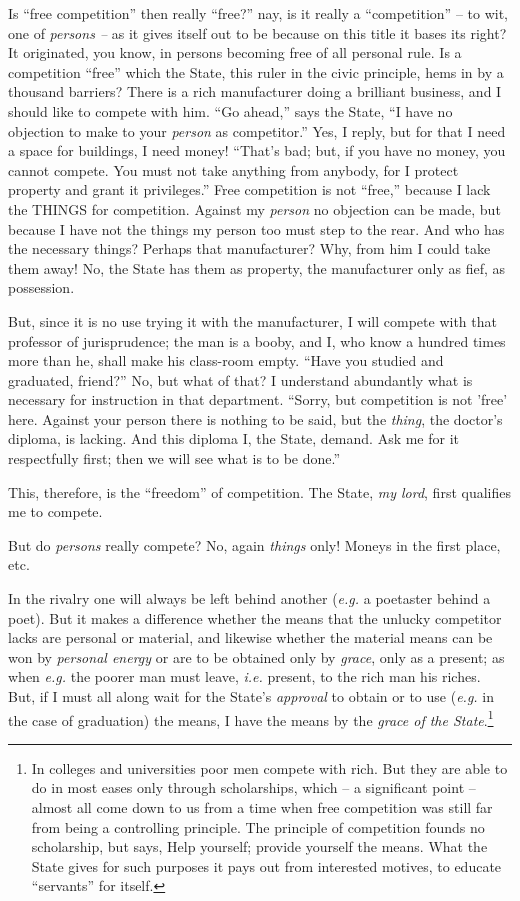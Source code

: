 Is ``free competition'' then really ``free?'' nay, is it really a 
``competition'' -- to wit, one of \textit{persons --} as it gives itself out 
to be because on this title it bases its right? It originated, you know, in 
persons becoming free of all personal rule. Is a competition ``free'' which 
the State, this ruler in the civic principle, hems in by a thousand barriers? 
There is a rich manufacturer doing a brilliant business, and I should like to 
compete with him. ``Go ahead,'' says the State, ``I have no objection to 
make to your \textit{person} as competitor.'' Yes, I reply, but for that I 
need a space for buildings, I need money! ``That's bad; but, if you have no 
money, you cannot compete. You must not take anything from anybody, for I 
protect property and grant it privileges.'' Free competition is not 
``free,'' because I lack the THINGS for competition. Against my 
\textit{person} no objection can be made, but because I have not the things my 
person too must step to the rear. And who has the necessary things? Perhaps 
that manufacturer? Why, from him I could take them away! No, the State has 
them as property, the manufacturer only as fief, as possession.

But, since it is no use trying it with the manufacturer, I will compete with 
that professor of jurisprudence; the man is a booby, and I, who know a hundred 
times more than he, shall make his class-room empty. ``Have you studied and 
graduated, friend?'' No, but what of that? I understand abundantly what is 
necessary for instruction in that department. ``Sorry, but competition is not 
'free' here. Against your person there is nothing to be said, but the 
\textit{thing}, the doctor's diploma, is lacking. And this diploma I, the 
State, demand. Ask me for it respectfully first; then we will see what is to 
be done.''

This, therefore, is the ``freedom'' of competition. The State, \textit{my 
lord}, first qualifies me to compete.

But do \textit{persons} really compete? No, again \textit{things} only! Moneys 
in the first place, etc.

In the rivalry one will always be left behind another (\textit{e.g.} a 
poetaster behind a poet). But it makes a difference whether the means that the 
unlucky competitor lacks are personal or material, and likewise whether the 
material means can be won by \textit{personal energy} or are to be obtained 
only by \textit{grace}, only as a present; as when \textit{e.g.} the poorer 
man must leave, \textit{i.e.} present, to the rich man his riches. But, if I 
must all along wait for the State's \textit{approval} to obtain or to use 
(\textit{e.g.} in the case of graduation) the means, I have the means by the 
\textit{grace of the State}.\footnote{In colleges and universities poor men 
compete with rich. But they are able to do in most eases only through 
scholarships, which -- a significant point -- almost all come down to us from 
a time when free competition was still far from being a controlling principle. 
The principle of competition founds no scholarship, but says, Help yourself; 
provide yourself the means. What the State gives for such purposes it pays out 
from interested motives, to educate ``servants'' for itself.}

